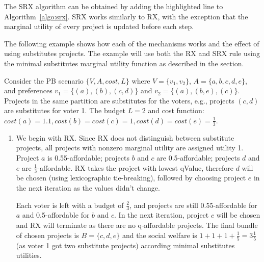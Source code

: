 \documentclass[runningheads]{llncs}
\begin{document}
The SRX algorithm can be obtained by adding the highlighted line to Algorithm~\ref{algo:srx}.  SRX works similarly to RX,  with the exception that the marginal utility of every project is updated before each step. 


The following example shows how each of the mechanisms works and the effect of using substitutes projects. The example will use both the  RX and SRX rule using the  minimal substitutes marginal utility function as described in the  section.

\begin{example}


Consider the 
PB scenario $\{V,A,cost,L\}$  where $V=\{v_1,v_2\}$, $A=\{a,b,c,d,e\}$, and preferences $v_1=\{(a),(b),(c,d)\}$ and  $v_2=\{(a),(b,e),(c)\}$. Projects in the same partition are  substitutes for the voters, e.g., projects $(c,d)$ are substitutes for voter 1. The budget $L=2$ and cost function: $cost(a)=1.1,cost(b)=cost(c)=1, cost(d)=cost(e)=\frac{1}{3}$. 


\begin{enumerate}
    \item  We begin with RX. Since  RX does not distinguish between substitute projects,   all projects with nonzero marginal utility  are assigned  utility 1.
    Project $a$ is 0.55-affordable; projects $b$ and $c$ are 0.5-affordable; projects $d$ and $e$ are $\frac{1}{3}$-affordable. RX takes the project with lowest qValue, therefore $d$ will be chosen (using lexicographic tie-breaking), followed by choosing project $e$ in the next iteration as the values didn't change.  
    
    Each voter is  left with a budget of $\frac{2}{3}$, and  projects are still 0.55-affordable for $a$ and 0.5-affordable for $b$ and $c$. In the next iteration, project $c$ will be chosen and RX will terminate as there are no  q-affordable projects. The final bundle of chosen projects is  $B=\{c,d,e\}$ and the social welfare is $1+1+1+\frac{1}{5}=3\frac{1}{5}$ (as voter 1 got two substitute projects) according minimal substitutes utilities. 
    

\end{enumerate}
\end{example}
\end{document}
